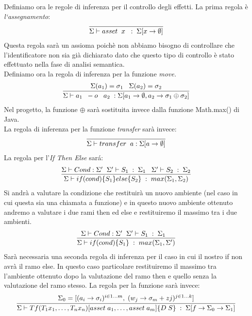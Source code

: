 \documentclass[12pt, a4paper]{report}
\begin{document}
Definiamo ora le regole di inferenza per il controllo degli effetti.
La prima regola è \emph{l`assegnamento}:
\[
\infer{\Sigma \vdash asset \;\; x\;\;:\;\Sigma[x\rightarrow \emptyset]}{}    
\]
Questa regola sarà un assioma poichè non abbiamo bisogno di controllare che l'identificatore non sia già dichiarato dato che questo tipo di controllo è stato effettuato nella fase di analisi semantica.\\
Definiamo ora la regola di inferenza per la funzione \emph{move.}
\[
\infer{\Sigma \vdash a_1\;\; -o\;\;\; a_2\; : \Sigma[a_1 \rightarrow \emptyset , a_2 \rightarrow \sigma_1 \oplus \sigma_2]}{
\Sigma(a_1) = \sigma_1 \;\;\; \Sigma(a_2) = \sigma_2 }    
\]
Nel progetto, la funzione $\oplus$ sarà sostituita invece dalla funzione Math.max() di Java.\\
La regola di inferenza per la funzione \emph{transfer} sarà invece:
\[
\infer{\Sigma \vdash transfer \;\;a : \Sigma[a \rightarrow \emptyset] }{}    
\]
La regola per l'\emph{If Then Else} sará:
\[
\infer{\Sigma \vdash if(cond)\{S_1\}else\{S_2\} \;:\;max(\Sigma_1,\Sigma_2)}{\Sigma \vdash Cond :\Sigma'\;\;\Sigma' \vdash S_1\;:\;\Sigma_1 \;\;\; \Sigma' \vdash S_2\;:\;\Sigma_2}
\]
Si andrà a valutare la condizione che restituirà un nuovo ambiente (nel caso in cui questa sia una chiamata a funzione) e in questo nuovo ambiente ottenuto andremo a valutare i due rami then ed else e restituiremo il massimo tra i due ambienti. 
\[
\infer{\Sigma \vdash if(cond)\{S_1\} \;:\;max(\Sigma_1,\Sigma')}{\Sigma \vdash Cond :\Sigma'\;\;\Sigma' \vdash S_1\;:\;\Sigma_1 \;\;\;}
\]
Sarà necessaria una seconda regola di inferenza per il caso in cui il nostro if non avrà il ramo else. In questo caso particolare restituiremo il massimo tra l'ambiente ottenuto dopo la valutazione del ramo then e quello senza la valutazione del ramo stesso. 
La regola per la funzione sarà invece:
\[
\infer{\Sigma\vdash T f(T_1x_1,\dots, T_n x_n)[asset\;a_1,\dots,asset\;a_m]\{D\;S\} \;:\; \Sigma[f \rightarrow \Sigma_0 \rightarrow \Sigma_1] }
{\Sigma_0 = [(a_i \rightarrow \sigma_i)^{i \in 1\dots m},\;(w_j \rightarrow \sigma_m+zj)^{j \in 1 \dots k }]}
\]
\end{document}
